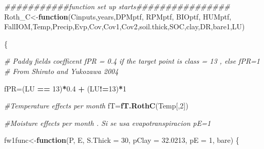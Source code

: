 \documentclass[
  10pt,
  b5paper,
]{book}
\newenvironment{Shaded}{\begin{snugshade}}{\end{snugshade}}
\newcommand{\CommentTok}[1]{\textcolor[rgb]{0.56,0.35,0.01}{\textit{#1}}}
\newcommand{\ControlFlowTok}[1]{\textcolor[rgb]{0.13,0.29,0.53}{\textbf{#1}}}
\newcommand{\DataTypeTok}[1]{\textcolor[rgb]{0.13,0.29,0.53}{#1}}
\newcommand{\DecValTok}[1]{\textcolor[rgb]{0.00,0.00,0.81}{#1}}
\newcommand{\FloatTok}[1]{\textcolor[rgb]{0.00,0.00,0.81}{#1}}
\newcommand{\KeywordTok}[1]{\textcolor[rgb]{0.13,0.29,0.53}{\textbf{#1}}}
\newcommand{\NormalTok}[1]{#1}
\newcommand{\OperatorTok}[1]{\textcolor[rgb]{0.81,0.36,0.00}{\textbf{#1}}}
\newcommand{\StringTok}[1]{\textcolor[rgb]{0.31,0.60,0.02}{#1}}
\begin{document}
\begin{Shaded}
\begin{Highlighting}[]
\CommentTok{###########function set up starts################}
\NormalTok{Roth_C<-}\ControlFlowTok{function}\NormalTok{(Cinputs,years,DPMptf, RPMptf, BIOptf, HUMptf, FallIOM,Temp,Precip,Evp,Cov,Cov1,Cov2,soil.thick,SOC,clay,DR,bare1,LU)}

\NormalTok{\{}

\CommentTok{# Paddy fields coefficent fPR = 0.4 if the target point is class = 13 , else fPR=1}
\CommentTok{# From Shirato and Yukozawa 2004}

\NormalTok{fPR=(LU }\OperatorTok{==}\StringTok{ }\DecValTok{13}\NormalTok{)}\OperatorTok{*}\FloatTok{0.4} \OperatorTok{+}\StringTok{ }\NormalTok{(LU}\OperatorTok{!=}\DecValTok{13}\NormalTok{)}\OperatorTok{*}\DecValTok{1}

\CommentTok{#Temperature effects per month}
\NormalTok{fT=}\KeywordTok{fT.RothC}\NormalTok{(Temp[,}\DecValTok{2}\NormalTok{]) }

\CommentTok{#Moisture effects per month . Si se usa evapotranspiracion pE=1}

\NormalTok{fw1func<-}\ControlFlowTok{function}\NormalTok{(P, E, }\DataTypeTok{S.Thick =} \DecValTok{30}\NormalTok{, }\DataTypeTok{pClay =} \FloatTok{32.0213}\NormalTok{, }\DataTypeTok{pE =} \DecValTok{1}\NormalTok{, bare) }
\NormalTok{\{}
   

\end{Highlighting}
\end{Shaded}
\end{document}
